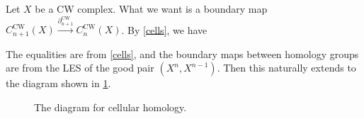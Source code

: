 Let $X$ be a CW complex. What we want is a boundary map $C_{n+1}^{\text{CW}}(X)\overset{\partial _{n+1}^{\text{CW}}}{\longrightarrow}C_n ^{\text{CW}}(X) $. By \cref{cells}, we have
\begin{figure}[H]
\centering
{}
\end{figure}
The equalities are from \cref{cells}, and the boundary maps between homology groups are from the LES of the good pair $(X^n,X^{n-1})$. Then this naturally extends to the diagram shown in \cref{celldiagram}. 
\begin{figure}[H]
\centering
{}
\caption{The diagram for cellular homology.}
\label{celldiagram}
\end{figure}
